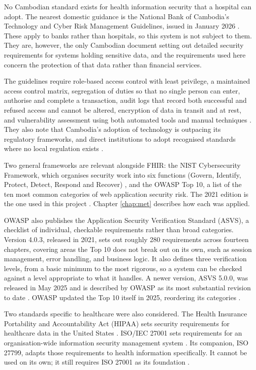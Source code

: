 No Cambodian standard exists for health information security that a hospital can adopt. The nearest domestic guidance is the National Bank of Cambodia's Technology and Cyber Risk Management Guidelines, issued in January 2026 \cite{nbc2026}. These apply to banks rather than hospitals, so this system is not subject to them. They are, however, the only Cambodian document setting out detailed security requirements for systems holding sensitive data, and the requirements used here concern the protection of that data rather than financial services.

The guidelines require role-based access control with least privilege, a maintained access control matrix, segregation of duties so that no single person can enter, authorise and complete a transaction, audit logs that record both successful and refused access and cannot be altered, encryption of data in transit and at rest, and vulnerability assessment using both automated tools and manual techniques \cite{nbc2026}. They also note that Cambodia's adoption of technology is outpacing its regulatory frameworks, and direct institutions to adopt recognised standards where no local regulation exists \cite{nbc2026}.

Two general frameworks are relevant alongside FHIR: the NIST Cybersecurity Framework, which organises security work into six functions (Govern, Identify, Protect, Detect, Respond and Recover) \cite{nistcsf2}, and the OWASP Top 10, a list of the ten most common categories of web application security risk. The 2021 edition is the one used in this project \cite{owasp2021}. Chapter \ref{chap:met} describes how each was applied.

OWASP also publishes the Application Security Verification Standard (ASVS), a checklist of individual, checkable requirements rather than broad categories. Version 4.0.3, released in 2021, sets out roughly 280 requirements across fourteen chapters, covering areas the Top 10 does not break out on its own, such as session management, error handling, and business logic. It also defines three verification levels, from a basic minimum to the most rigorous, so a system can be checked against a level appropriate to what it handles. A newer version, ASVS 5.0.0, was released in May 2025 and is described by OWASP as its most substantial revision to date \cite{owaspasvs}. OWASP updated the Top 10 itself in 2025, reordering its categories \cite{owasp2025}.

Two standards specific to healthcare were also considered. The Health Insurance Portability and Accountability Act (HIPAA) sets security requirements for healthcare data in the United States \cite{hipaa}. ISO/IEC 27001 sets requirements for an organisation-wide information security management system \cite{iso27001}. Its companion, ISO 27799, adapts those requirements to health information specifically. It cannot be used on its own; it still requires ISO 27001 as its foundation \cite{iso27799}.

